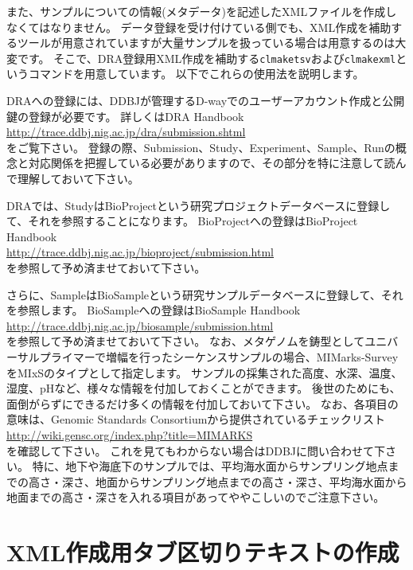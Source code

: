 \documentclass[titlepage,10pt,a4paper]{jsbook}
\begin{document}
また、サンプルについての情報(メタデータ)を記述したXMLファイルを作成しなくてはなりません。
データ登録を受け付けている側でも、XML作成を補助するツールが用意されていますが大量サンプルを扱っている場合は用意するのは大変です。
そこで、DRA登録用XML作成を補助する\texttt{clmaketsv}および\texttt{clmakexml}というコマンドを用意しています。
以下でこれらの使用法を説明します。

DRAへの登録には、DDBJが管理するD-wayでのユーザーアカウント作成と公開鍵の登録が必要です。
詳しくはDRA Handbook\\
\href{http://trace.ddbj.nig.ac.jp/dra/submission.shtml}{http://trace.ddbj.nig.ac.jp/dra/submission.shtml}\\
をご覧下さい。
登録の際、Submission、Study、Experiment、Sample、Runの概念と対応関係を把握している必要がありますので、その部分を特に注意して読んで理解しておいて下さい。

DRAでは、StudyはBioProjectという研究プロジェクトデータベースに登録して、それを参照することになります。
BioProjectへの登録はBioProject Handbook\\
\href{http://trace.ddbj.nig.ac.jp/bioproject/submission.html}{http://trace.ddbj.nig.ac.jp/bioproject/submission.html}\\
を参照して予め済ませておいて下さい。

さらに、SampleはBioSampleという研究サンプルデータベースに登録して、それを参照します。
BioSampleへの登録はBioSample Handbook\\
\href{http://trace.ddbj.nig.ac.jp/biosample/submission.html}{http://trace.ddbj.nig.ac.jp/biosample/submission.html}\\
を参照して予め済ませておいて下さい。
なお、メタゲノムを鋳型としてユニバーサルプライマーで増幅を行ったシーケンスサンプルの場合、MIMarks-SurveyをMIxSのタイプとして指定します。
サンプルの採集された高度、水深、温度、湿度、pHなど、様々な情報を付加しておくことができます。
後世のためにも、面倒がらずにできるだけ多くの情報を付加しておいて下さい。
なお、各項目の意味は、Genomic Standards Consortiumから提供されているチェックリスト\\
\href{http://wiki.gensc.org/index.php?title=MIMARKS}{http://wiki.gensc.org/index.php?title=MIMARKS}\\
を確認して下さい。
これを見てもわからない場合はDDBJに問い合わせて下さい。
特に、地下や海底下のサンプルでは、平均海水面からサンプリング地点までの高さ・深さ、地面からサンプリング地点までの高さ・深さ、平均海水面から地面までの高さ・深さを入れる項目があってややこしいのでご注意下さい。

\section{XML作成用タブ区切りテキストの作成}
\end{document}
